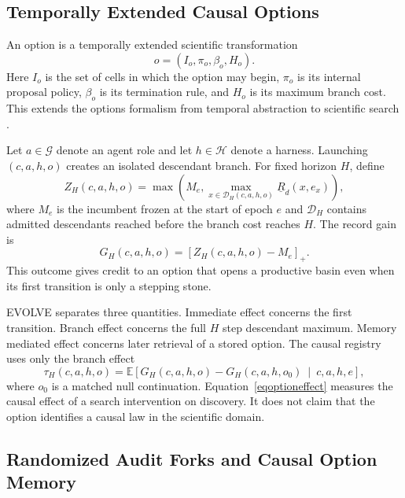 \documentclass{article}
\newcommand{\Data}{\mathcal{D}}
\newcommand{\Harness}{\mathcal{H}}
\newcommand{\Agents}{\mathcal{G}}
\newcommand{\pos}[1]{\left[#1\right]_{+}}
\newcommand{\lcb}{\underline{R}}
\begin{document}
\subsection{Temporally Extended Causal Options}
\label{secoptions}

An option is a temporally extended scientific transformation
\begin{equation}
o
=
\left(
I_o,
\pi_o,
\beta_o,
H_o
\right).
\label{eqoption}
\end{equation}
Here $I_o$ is the set of cells in which the option may begin, $\pi_o$ is its internal proposal policy, $\beta_o$ is its termination rule, and $H_o$ is its maximum branch cost. This extends the options formalism from temporal abstraction to scientific search \citep{sutton1999,bacon2017}.

Let $a\in\Agents$ denote an agent role and let $h\in\Harness$ denote a harness. Launching $(c,a,h,o)$ creates an isolated descendant branch. For fixed horizon $H$, define
\begin{equation}
Z_H(c,a,h,o)
=
\max\left(
M_e,
\max_{x\in\Data_H(c,a,h,o)}
\lcb_d(x,e_x)
\right),
\label{eqdescendantmax}
\end{equation}
where $M_e$ is the incumbent frozen at the start of epoch $e$ and $\Data_H$ contains admitted descendants reached before the branch cost reaches $H$. The record gain is
\begin{equation}
G_H(c,a,h,o)
=
\pos{Z_H(c,a,h,o)-M_e}.
\label{eqrecordgain}
\end{equation}
This outcome gives credit to an option that opens a productive basin even when its first transition is only a stepping stone.

EVOLVE separates three quantities. Immediate effect concerns the first transition. Branch effect concerns the full $H$ step descendant maximum. Memory mediated effect concerns later retrieval of a stored option. The causal registry uses only the branch effect
\begin{equation}
\tau_H(c,a,h,o)
=
\mathbb E\!\left[
G_H(c,a,h,o)-G_H(c,a,h,o_0)
\ \middle|\ 
c,a,h,e
\right],
\label{eqoptioneffect}
\end{equation}
where $o_0$ is a matched null continuation. Equation~\eqref{eqoptioneffect} measures the causal effect of a search intervention on discovery. It does not claim that the option identifies a causal law in the scientific domain.

\subsection{Randomized Audit Forks and Causal Option Memory}
\label{secaudit}
\end{document}
